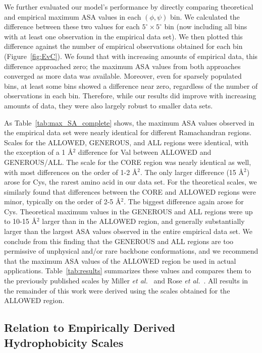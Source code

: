 \documentclass[11pt]{article}
\begin{document}
We further evaluated our model's performance by directly comparing theoretical and empirical maximum ASA values in each $(\phi, \psi)$ bin. We calculated the difference between these two values for each $5^\circ\times5^\circ$ bin (now including all bins with at least one observation in the empirical data set). We then plotted this difference against the number of empirical observations obtained for each bin (Figure~\ref{fig:EvC}). We found that with increasing amounts of empirical data, this difference approached zero; the maximum ASA values from both approaches converged as more data was available. Moreover, even for sparsely populated bins, at least some bins showed a difference near zero, regardless of the number of observations in each bin. Therefore, while our results did improve with increasing amounts of data, they were also largely robust to smaller data sets.

As Table~\ref{tab:max_SA_complete} shows, the maximum ASA values observed in the empirical data set were nearly identical for different Ramachandran regions. Scales for the ALLOWED, GENEROUS, and ALL regions were identical, with the exception of a 1 \AA$^2$ difference for Val between ALLOWED and GENEROUS/ALL. The scale for the CORE region was nearly identical as well, with most differences on the order of 1-2 \AA$^2$. The only larger difference (15 \AA$^2$) arose for Cys, the rarest amino acid in our data set. For the theoretical scales, we similarly found that differences between the CORE and ALLOWED regions were minor, typically on the order of 2-5 \AA$^2$. The biggest difference again arose for Cys. Theoretical maximum values in the GENEROUS and ALL regions were up to 10-15 \AA$^2$ larger than in the ALLOWED region, and generally substantially larger than the largest ASA values observed in the entire empirical data set. We conclude from this finding that the GENEROUS and ALL regions are too permissive of unphysical and/or rare backbone conformations, and we recommend that the maximum ASA values of the ALLOWED region be used in actual applications. Table~\ref{tab:results} summarizes these values and compares them to the previously published scales by Miller \emph{et al.}~\cite{Miller1987} and Rose \emph{et al.}~\cite{Rose1985}. All results in the remainder of this work were derived using the scales obtained for the ALLOWED region.

\subsection*{Relation to Empirically Derived Hydrophobicity Scales}
\end{document}
